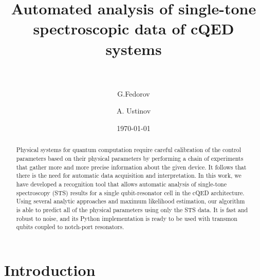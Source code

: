 \documentclass[%
 aip,
 draft,
 amsmath,amssymb,
 reprint,%
]{revtex4-1}
\begin{document}

\title[Automated analysis of single-tone spectroscopic data of cQED systems]{Automated analysis of single-tone spectroscopic data of cQED systems\\~}

\author{G.Fedorov}

%
%

\author{A. Ustinov}
%
%

\date{\today}%

\begin{abstract}
Physical systems for quantum computation require careful calibration of the control parameters based on their physical parameters by performing a chain of experiments that gather more and more precise information about the given device. It follows that there is the need for automatic data acquisition and interpretation. In this work, we have developed a recognition tool that allows automatic analysis of single-tone spectroscopy (STS) results for a single qubit-resonator cell in the cQED architecture. Using several analytic approaches and maximum likelihood estimation, our algorithm is able to predict all of the physical parameters using only the STS data. It is fast and robust to noise, and its Python implementation is ready to be used with transmon qubits coupled to notch-port resonators.
\end{abstract}

\maketitle

 \renewcommand*{\figureautorefname}{Fig.}

\section{Introduction} \label{sec:level1} 
\end{document}
